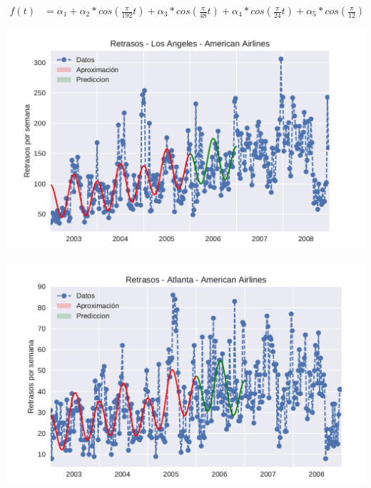 \begin{align}
f(t) &= \alpha_1 + \alpha_2 * cos(\frac{\pi}{192} t) + \alpha_3 * cos(\frac{\pi}{48} t) + \alpha_4 * cos(\frac{\pi}{24} t) + \alpha_5 * cos(\frac{\pi}{12})
\end{align}



{\centering
  \includegraphics[width=1.0\linewidth]{informe/imagenes/retrasosAmericanAirlinesLAvol2.pdf}
}
$ $\newline
{\centering
  \includegraphics[width=1.0\linewidth]{informe/imagenes/retrasosAmericanAirlinesATLvol2.pdf}
}
$ $\newline



